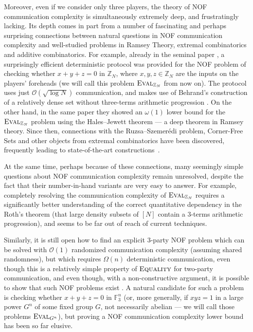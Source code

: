 \documentclass[10pt,a4paper]{article}
\newcommand{\F}{\mathbb{F}}
\newcommand{\bZ}{\mathbb{Z}}
\newcommand{\eval}{\textsc{Eval}}
\newcommand{\Oh}{\mathcal{O}}
\begin{document}
Moreover, even if we consider only three players, the theory of NOF communication complexity is simultaneously extremely deep, and frustratingly lacking. Its depth comes in part from a number of fascinating and perhaps surprising connections between natural questions in NOF communication complexity and well-studied problems in Ramsey Theory, extremal combinatorics and additive combinatorics. For example, already in the seminal paper \cite{CFL83}, a surprisingly efficient deterministic protocol  was provided for the NOF problem of checking whether $x+y+z = 0$ in $\bZ_N$, where $x,y,z \in \bZ_N$ are the inputs on the players' foreheads (we will call this problem $\eval_{\bZ_N}$ from now on). The protocol uses just $\Oh(\sqrt{\log N})$ communication, and makes use of Behrand's construction of a relatively dense set without three-terms arithmetic progression \cite{behrend}. On the other hand, in the same paper they showed an $\omega(1)$ lower bound for the $\eval_{\bZ_N}$ problem using the Hales–Jewett theorem --- a deep theorem in Ramsey theory. Since then, connections with the Ruzsa–Szemerédi problem, Corner-Free Sets and other objects from extremal combinatorics have been discovered, frequently leading to state-of-the-art constructions~\cite{LPS17, AS20,AMS12,LS21, CFTZ21}.

At the same time, perhaps because of these connections, many seemingly simple questions about NOF communication complexity remain unresolved, despite the fact that their number-in-hand variants are very easy to answer. For example, completely resolving the communication complexity of $\eval_{\bZ_N}$ requires a significantly better understanding of the correct quantitative dependency in the Roth's theorem (that large density subsets of $[N]$ contain a 3-terms arithmetic progression), and seems to be far out of reach of current techniques. 

Similarly, it is still open how to find an explicit $3$-party NOF problem which can be solved with $\Oh(1)$ randomized communication complexity (assuming shared randomness), but  which requires $\Omega(n)$ deterministic communication, even though this is a relatively simple property of $\textsc{Equality}$ for two-party communication, and even though, with a non-constructive argument, it is possible to show that such NOF problems exist \cite{DP08}. A natural candidate for such a problem is checking whether $x+y+z = 0$ in $\F_3^n$ (or, more generally, if $xyz = 1$ in a large power $G^n$ of some fixed group $G$, not necessarily abelian --- we will call those problems $\eval_{G^n}$), but proving a NOF communication complexity lower bound has been so far elusive.
\end{document}
